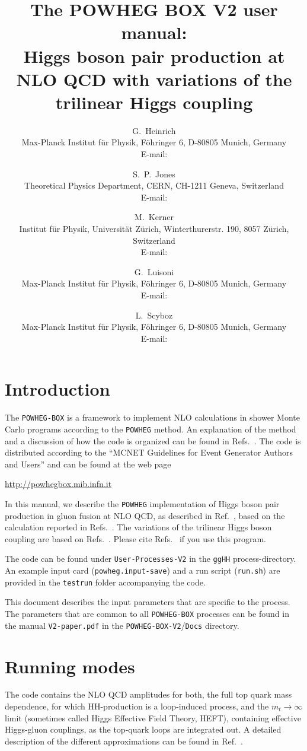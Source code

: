\documentclass[paper]{JHEP3}
\title{The POWHEG BOX V2 user manual:\\
  Higgs boson pair production at NLO QCD with variations of the trilinear Higgs coupling} \vfill
\author{G.~Heinrich\\ 
  Max-Planck Institut f{\"u}r Physik, F\"ohringer 6, D-80805 Munich, Germany\\
  E-mail: \email{gudrun@mpp.mpg.de}
}
\author{S.~P.~Jones \\ 
Theoretical Physics Department, CERN, CH-1211 Geneva, Switzerland  \\
  E-mail: \email{s.jones@cern.ch}
}
\author{M.~Kerner \\ 
  Institut f{\"u}r Physik, Universit{\"a}t Z{\"u}rich, Winterthurerstr. 190, 8057 Z{\"u}rich, Switzerland\\
  E-mail: \email{kerner@mpp.mpg.de}
}
\author{G.~Luisoni\\
Max-Planck Institut f{\"u}r Physik, F\"ohringer 6, D-80805 Munich, Germany\\ 
  E-mail: \email{luisonig@gmail.com}
  }
\author{L.~Scyboz\\
 Max-Planck Institut f{\"u}r Physik, F\"ohringer 6, D-80805 Munich, Germany\\ 
  E-mail: \email{scyboz@mpp.mpg.de}
}
\newcommand\POWHEG{{\tt POWHEG}}
\newcommand\POWHEGBOX{{\tt POWHEG-BOX}}
\newcommand\POWHEGBOXV{{\tt POWHEG-BOX-V2}}
\begin{document}
\section{Introduction}

The \POWHEGBOX{} is a framework to implement NLO
calculations in shower Monte Carlo programs according to the \POWHEG{}
method. An explanation of the method and a discussion of how the code
is organized can be found in
Refs.~\cite{Nason:2004rx,Frixione:2007vw,Alioli:2010xd,Jezo:2015aia}.
The code is distributed according to the ``MCNET Guidelines for Event
Generator Authors and Users'' and can be found at the web page
%
\begin{center}
 \url{http://powhegbox.mib.infn.it}
\end{center}
%
In this manual, we describe the \POWHEG{} implementation of Higgs
boson pair production in gluon fusion at NLO QCD, as described in
Ref.~\cite{Heinrich:2017kxx}, based on the calculation reported in
Refs.~\cite{Borowka:2016ehy,Borowka:2016ypz}.  
The variations of the trilinear Higgs boson coupling are based on Refs.~\cite{Heinrich:2019bkc,Buchalla:2018yce}.
Please cite Refs.~\cite{Heinrich:2019bkc,Heinrich:2017kxx} if you use this program.

The code can be found under {\tt User-Processes-V2} in the {\tt ggHH} process-directory. 
An example input card ({\tt powheg.input-save}) and a run script ({\tt run.sh}) 
are provided in the {\tt testrun} folder accompanying the code.

This document describes the input parameters that are specific to the process. The
parameters that are common to all \POWHEGBOX{} processes can be found
in the manual {\tt V2-paper.pdf} in the \POWHEGBOXV{}/{\tt Docs} directory.

\section{Running modes}
The code contains the NLO QCD amplitudes for both, the full top quark mass dependence, 
for which HH-production is a loop-induced process, and the
$m_t\to \infty$ limit (sometimes called Higgs Effective Field Theory, HEFT), 
containing effective Higgs-gluon couplings, as the top-quark loops are integrated out.  
A detailed description of the different approximations can be found in Ref.~\cite{Borowka:2016ypz}.
\end{document}
